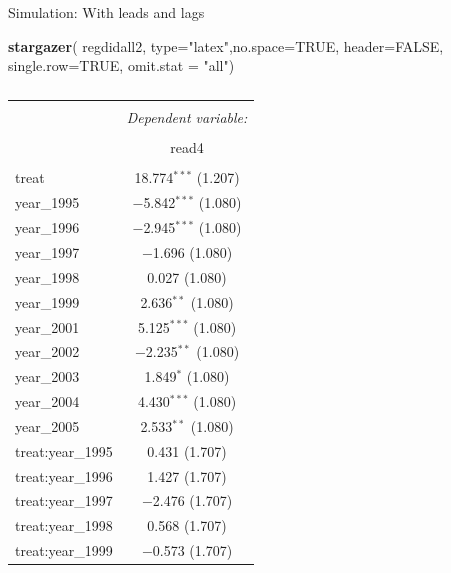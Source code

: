 \documentclass[
  ignorenonframetext,
]{beamer}
\newenvironment{Shaded}{\begin{snugshade}}{\end{snugshade}}
\newcommand{\DataTypeTok}[1]{\textcolor[rgb]{0.13,0.29,0.53}{#1}}
\newcommand{\KeywordTok}[1]{\textcolor[rgb]{0.13,0.29,0.53}{\textbf{#1}}}
\newcommand{\NormalTok}[1]{#1}
\newcommand{\OtherTok}[1]{\textcolor[rgb]{0.56,0.35,0.01}{#1}}
\newcommand{\StringTok}[1]{\textcolor[rgb]{0.31,0.60,0.02}{#1}}
\begin{document}
\begin{frame}[fragile]{Simulation: With leads and lags}
\protect\hypertarget{simulation-with-leads-and-lags-3}{}
\tiny

\begin{Shaded}
\begin{Highlighting}[]
\KeywordTok{stargazer}\NormalTok{( regdidall2, }\DataTypeTok{type=}\StringTok{"latex"}\NormalTok{,}\DataTypeTok{no.space=}\OtherTok{TRUE}\NormalTok{, }\DataTypeTok{header=}\OtherTok{FALSE}\NormalTok{, }\DataTypeTok{single.row=}\OtherTok{TRUE}\NormalTok{, }\DataTypeTok{omit.stat =} \StringTok{"all"}\NormalTok{)}
\end{Highlighting}
\end{Shaded}

\begin{table}[!htbp] \centering 
  \caption{} 
  \label{} 
\begin{tabular}{@{\extracolsep{5pt}}lc} 
\\[-1.8ex]\hline 
\hline \\[-1.8ex] 
 & \multicolumn{1}{c}{\textit{Dependent variable:}} \\ 
\cline{2-2} 
\\[-1.8ex] & read4 \\ 
\hline \\[-1.8ex] 
 treat & 18.774$^{***}$ (1.207) \\ 
  year\_1995 & $-$5.842$^{***}$ (1.080) \\ 
  year\_1996 & $-$2.945$^{***}$ (1.080) \\ 
  year\_1997 & $-$1.696 (1.080) \\ 
  year\_1998 & 0.027 (1.080) \\ 
  year\_1999 & 2.636$^{**}$ (1.080) \\ 
  year\_2001 & 5.125$^{***}$ (1.080) \\ 
  year\_2002 & $-$2.235$^{**}$ (1.080) \\ 
  year\_2003 & 1.849$^{*}$ (1.080) \\ 
  year\_2004 & 4.430$^{***}$ (1.080) \\ 
  year\_2005 & 2.533$^{**}$ (1.080) \\ 
  treat:year\_1995 & 0.431 (1.707) \\ 
  treat:year\_1996 & 1.427 (1.707) \\ 
  treat:year\_1997 & $-$2.476 (1.707) \\ 
  treat:year\_1998 & 0.568 (1.707) \\ 
  treat:year\_1999 & $-$0.573 (1.707) \\ 

\end{tabular}
\end{table}
\end{frame}
\end{document}

